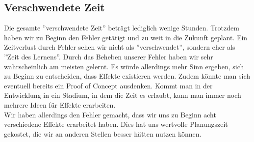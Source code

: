 \subsection*{Verschwendete Zeit}
Die gesamte ''verschwendete Zeit'' beträgt lediglich wenige Stunden. Trotzdem haben wir zu Beginn den Fehler getätigt und zu weit in die Zukunft geplant. Ein Zeitverlust durch Fehler
sehen wir nicht als ''verschwendet'', sondern eher als ''Zeit des Lernens''. Durch das Beheben unserer Fehler haben wir sehr wahrscheinlich am meisten gelernt.
Es würde allerdings mehr Sinn ergeben, sich zu Beginn zu entscheiden, dass Effekte existieren werden. Zudem könnte man sich eventuell bereits ein Proof of Concept ausdenken.
Kommt man in der Entwicklung in ein Stadium, in dem die Zeit es erlaubt, kann man immer noch mehrere Ideen für Effekte erarbeiten. \\
Wir haben allerdings den Fehler gemacht, dass wir uns zu Beginn acht verschiedene Effekte erarbeitet haben. Dies hat uns wertvolle Planungszeit gekostet, die wir an anderen Stellen besser hätten nutzen können.